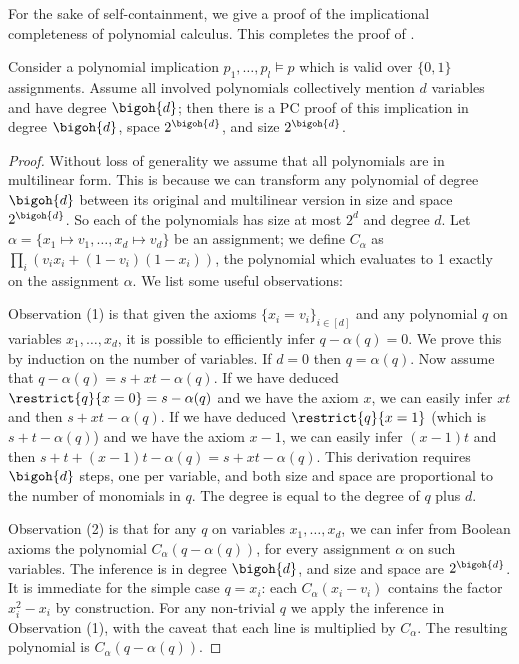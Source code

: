 For the sake of self-containment, we give a proof of the
implicational completeness of polynomial calculus. This completes the proof
%
of .    %

\begin{lemma}\label{lmm:pccompleteness}
  Consider a polynomial implication $p_{1}, \ldots, p_{l}\models p$ which is valid over $\{0,1\}$ assignments. Assume all involved polynomials collectively mention $d$ variables and have degree $\bigoh{d}$; then there is a PC proof of this implication in degree $\bigoh{d}$, space $2^{\bigoh{d}}$, and size $2^{\bigoh{d}}$.
\end{lemma}
\begin{proof} Without loss of generality we assume that all
  polynomials are in multilinear form. This is because we can
  transform any polynomial of degree $\bigoh{d}$ between its original
  and multilinear version in size and space $2^{\bigoh{d}}$. So each
  of the polynomials has size at most $2^{d}$ and degree $d$.
  Let $\alpha=\{x_{1}\mapsto v_{1}, \ldots, x_{d}\mapsto v_{d}\}$ be an assignment; we define $C_{\alpha}$ as $\prod_{i} (v_{i}x_{i} + (1-v_{i})(1-x_{i}))$, the polynomial which evaluates to 1 exactly on the assignment $\alpha$. We list some useful observations:

Observation (1) is that given the axioms $\{x_{i}=v_{i}\}_{i\in[d]}$
and any polynomial $q$ on variables $x_{1},\ldots,x_{d}$, it is
possible to efficiently infer $q-\alpha(q)=0$. We prove this by induction on the number of variables. If $d=0$ then $q=\alpha(q)$. Now assume that $q-\alpha(q)=s+xt-\alpha(q)$. If we have deduced $\restrict{q}{x=0}=s-\alpha(q)$ and we have the axiom $x$, we can easily infer $xt$ and then $s+xt-\alpha(q)$. If we have deduced $\restrict{q}{x=1}$ (which is $s+t-\alpha(q)$) and we have the axiom $x-1$, we can easily infer $(x-1)t$ and then $s+t+(x-1)t -\alpha(q) = s + xt -\alpha(q)$.
%
This derivation requires $\bigoh{d}$ steps, one per variable, and both
size and space are proportional to the number of monomials in $q$. The
degree is equal to the degree of $q$ plus $d$.

Observation (2) is that for any $q$ on variables $x_{1},\ldots,x_{d}$,
we can infer from Boolean axioms the polynomial
$C_{\alpha}(q-\alpha(q))$, for every assignment $\alpha$ on such
variables. The inference is in degree $\bigoh{d}$, and size and space are
$2^{\bigoh{d}}$. It is immediate for the simple case $q=x_{i}$: each
$C_{\alpha}(x_{i}-v_{i})$ contains the factor $x^{2}_{i}-x_{i}$ by
construction. For any non-trivial $q$ we apply the inference in
Observation (1), with the caveat that each line is multiplied by
$C_{\alpha}$. The resulting polynomial is $C_{\alpha}(q-\alpha(q))$.


\end{proof}
